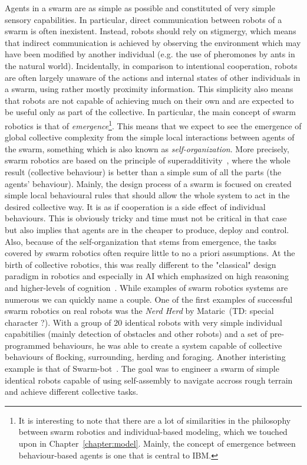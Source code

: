     Agents in a swarm are as simple as possible and constituted of very simple sensory capabilities. In particular, direct communication between robots of a swarm is often inexistent. Instead, robots should rely on stigmergy, which means that indirect communication is achieved by observing the environment which may have been modified by another individual (e.g. the use of pheromones by ants in the natural world). Incidentally, in comparison to intentional cooperation, robots are often largely unaware of the actions and internal states of other individuals in a swarm, using rather mostly proximity information. This simplicity also means that robots are not capable of achieving much on their own and are expected to be useful only as part of the collective. In particular, the main concept of swarm robotics is that of \emph{emergence}\footnote{It is interesting to note that there are a lot of similarities in the philosophy between swarm robotics and individual-based modeling, which we touched upon in Chapter~\ref{chapter:model}. Mainly, the concept of emergence between behaviour-based agents is one that is central to IBM.}. This means that we expect to see the emergence of global collective complexity from the simple local interactions between agents of the swarm, something which is also known as \emph{self-organization}. More precisely, swarm robotics are based on the principle of superadditivity~\cite{Parker2008}, where the whole result (collective behaviour) is better than a simple sum of all the parts (the agents' behaviour). Mainly, the design process of a swarm is focused on created simple local behavioural rules that should allow the whole system to act in the desired collective way. It is as if cooperation is a side effect of individual behaviours. This is obviously tricky and time must not be critical in that case but also implies that agents are in the cheaper to produce, deploy and control. Also, because of the self-organization that stems from emergence, the tasks covered by swarm robotics often require little to no a priori assumptions. At the birth of collective robotics, this was really different to the "classical" design paradigm in robotics and especially in AI which emphasized on high reasoning and higher-levels of cognition~\cite{Bonabeau1999}. While examples of swarm robotics systems are numerous we can quickly name a couple. One of the first examples of successful swarm robotics on real robots was the \emph{Nerd Herd} by Mataric~\cite{Mataric1995}(TD: special character ?). With a group of $20$ identical robots with very simple individual capabitilies (mainly detection of obstacles and other robots) and a set of pre-programmed behaviours, he was able to create a system capable of collective behaviours of flocking, surrounding, herding and foraging. Another interisting example is that of Swarm-bot~\cite{Mondada2004, Dorigo2004, Mondada2005}. The goal was to engineer a swarm of simple identical robots capable of using self-assembly to navigate accross rough terrain and achieve different collective tasks.

